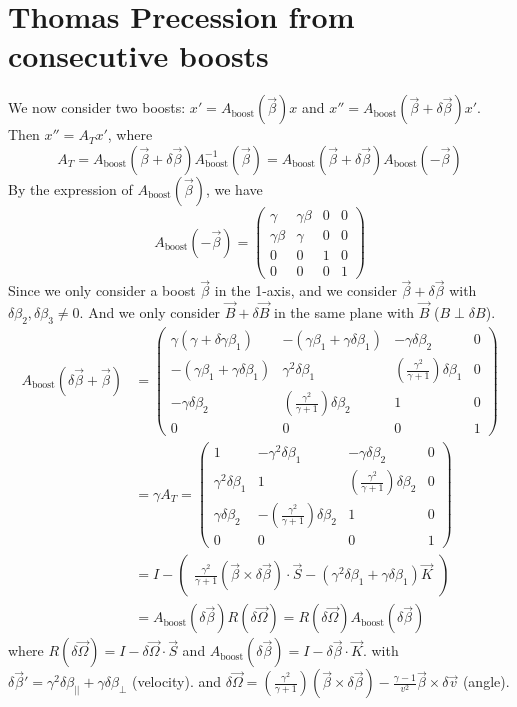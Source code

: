 \documentclass{article}
\begin{document}
	\section{Thomas Precession from consecutive boosts}
	We now consider two boosts: $x' = A_{\text{boost}}(\vec{\beta})x$ and $x'' = A_{\text{boost}}(\vec{\beta} + \delta\vec{\beta})x'$.
	Then $x'' = A_T x'$, where
	\[ A_T = A_{\text{boost}}(\vec{\beta} + \delta\vec{\beta}) A^{-1}_{\text{boost}}(\vec{\beta}) = A_{\text{boost}}(\vec{\beta} + \delta\vec{\beta}) A_{\text{boost}}(-\vec{\beta}) \]
	By the expression of $A_{\text{boost}}(\vec{\beta})$, we have
	\[ A_{\text{boost}}(-\vec{\beta}) = \begin{pmatrix} \gamma & \gamma\beta & 0 & 0 \\ \gamma\beta & \gamma & 0 & 0 \\ 0 & 0 & 1 & 0 \\ 0 & 0 & 0 & 1 \end{pmatrix} \]
	Since we only consider a boost $\vec{\beta}$ in the 1-axis, and we consider $\vec{\beta} + \delta\vec{\beta}$ with $\delta\beta_2, \delta\beta_3 \neq 0$.
	And we only consider $\vec{B} + \delta\vec{B}$ in the same plane with $\vec{B}$ ($B \perp \delta B$).
	\begin{align*}
		A_{\text{boost}}(\delta\vec{\beta} + \vec{\beta}) &= \begin{pmatrix} \gamma(\gamma+\delta\gamma\beta_1) & -(\gamma\beta_1 + \gamma\delta\beta_1) & -\gamma\delta\beta_2 & 0 \\ -(\gamma\beta_1+\gamma\delta\beta_1) & \gamma^2\delta\beta_1 & (\frac{\gamma^2}{\gamma+1})\delta\beta_1 & 0 \\ -\gamma\delta\beta_2 & (\frac{\gamma^2}{\gamma+1})\delta\beta_2 & 1 & 0 \\ 0 & 0 & 0 & 1 \end{pmatrix} \\
		&= \gamma A_T = \begin{pmatrix} 1 & -\gamma^2\delta\beta_1 & -\gamma\delta\beta_2 & 0 \\ \gamma^2\delta\beta_1 & 1 & (\frac{\gamma^2}{\gamma+1})\delta\beta_2 & 0 \\ \gamma\delta\beta_2 & -(\frac{\gamma^2}{\gamma+1})\delta\beta_2 & 1 & 0 \\ 0 & 0 & 0 & 1 \end{pmatrix} \\
		&= I - \begin{pmatrix} \frac{\gamma^2}{\gamma+1}(\vec{\beta} \times \delta\vec{\beta}) \cdot \vec{S} - (\gamma^2\delta\beta_1 + \gamma\delta\beta_1) \vec{K} \end{pmatrix} \\
		&= A_{\text{boost}}(\delta\vec{\beta}) R(\delta\vec{\Omega}) = R(\delta\vec{\Omega}) A_{\text{boost}}(\delta\vec{\beta})
	\end{align*}
	where $R(\delta\vec{\Omega}) = I - \delta\vec{\Omega} \cdot \vec{S}$ and $A_{\text{boost}}(\delta\vec{\beta}) = I - \delta\vec{\beta} \cdot \vec{K}$.
	with $\delta\vec{\beta}' = \gamma^2\delta\beta_{||} + \gamma\delta\beta_{\perp}$ (velocity).
	and $\delta\vec{\Omega} = (\frac{\gamma^2}{\gamma+1})(\vec{\beta} \times \delta\vec{\beta}) - \frac{\gamma-1}{v^2}\vec{\beta} \times \delta\vec{v}$ (angle).
	
\end{document}
